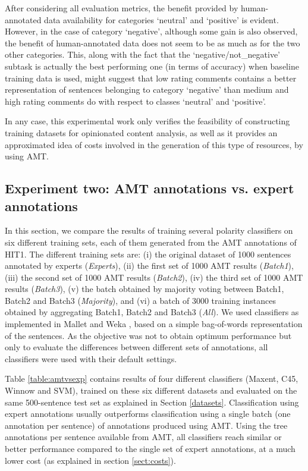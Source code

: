 \documentclass[11pt, a4paper,onecolumn]{article}
\begin{document}
After considering all evaluation metrics, the benefit provided by human-annotated data 
availability for categories `neutral' and `positive' is evident. However, in the case of category `negative', although some 
gain is also observed, the benefit of human-annotated data does not seem to be as much as for the two other 
categories. This, along with the fact that the `negative/not\_negative' subtask is actually the best performing
one (in terms of accuracy) when baseline training data is used, might suggest that low rating comments contains 
a better representation of sentences belonging to category `negative' than medium and high rating comments do with
respect to classes `neutral' and `positive'. 

In any case, this experimental work only verifies the feasibility of constructing training datasets for
opinionated content analysis, as well as it provides an approximated idea of costs involved in the generation
of this type of resources, by using AMT.


\subsection{Experiment two: AMT annotations vs. expert annotations}
\label{eval2}

In this section, we compare the results of training several polarity classifiers on six different training sets, each of them generated from the AMT annotations of HIT1. The different training sets are: (i) the original dataset of 1000 sentences annotated by experts (\textit{Experts}), (ii) the first set of 1000 AMT results (\textit{Batch1}), (iii) the second set of 1000 AMT results (\textit{Batch2}), (iv) the third set of 1000 AMT results (\textit{Batch3}), (v) the batch obtained by majority voting between Batch1, Batch2 and Batch3 (\textit{Majority}), and (vi) a batch of 3000 training instances obtained by aggregating Batch1, Batch2 and Batch3 (\textit{All}).  We used classifiers as implemented in Mallet \cite{mccallum} and Weka \cite{weka}, based on a simple bag-of-words representation of the sentences.  As the objective was not to obtain optimum performance but only to evaluate the differences between different sets of annotations, all classifiers were used with their default settings.

Table \ref{table:amtvsexp} contains results of four different classifiers (Maxent, C45, Winnow and SVM), trained on these six different datasets and evaluated on the same 500-sentence test set as explained in Section \ref{datasets}.  Classification using expert annotations usually outperforms classification using a single batch (one annotation per sentence) of annotations produced using AMT.  Using the tree annotations per sentence available from AMT, all classifiers reach similar or better performance compared to the single set of expert annotations, at a much lower cost (as explained in section \ref{sect:costs}).
\end{document}
